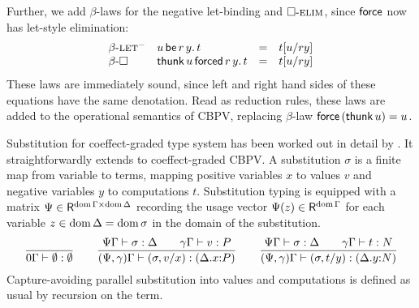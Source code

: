 \documentclass[acmsmall,review,anonymous]{acmart}\settopmatter{printfolios=true,printccs=false,printacmref=false}
\begin{document}
Further, we add $\beta$-laws for the negative
let-binding and $\relim\Box$, since $\tforce$ now has let-style elimination:
\[
\begin{array}{llcl}
\rbeta{\rlet^{-}}
  & \qlet r y u t
  & = & \qsubst u r y t
\\
\rbeta\Box
  & \qforced r {\thunk u} y t
  & = & \qsubst u r y t
\\
\end{array}
\]
These laws are immediately sound, since left and right hand sides of
these equations have the same denotation.
%
Read as reduction rules, these laws are added to the operational
semantics of CBPV, replacing $\beta$-law $\force{(\thunk u)} = u$.

Substitution for coeffect-graded type system has been worked
out in detail by \citet{atkeyWood:types19}.  It straightforwardly extends to
coeffect-graded CBPV.
%
A substitution $\sigma$ is a finite map from variable to terms,
mapping positive variables $x$ to values $v$ and negative variables
$y$ to computations $t$.  Substitution typing
\fbox{$\SubstTy \Psi \Gamma \sigma \Delta$} is equipped with a matrix
$\Psi \in \R^{\dom\Gamma \times \dom\Delta}$ recording the usage
vector $\Psi(z) \in \R^{\dom\Gamma}$ for each variable
$z \in \dom\Delta = \dom \sigma$ in the domain of the substitution.
\[
  \ru{
    }{\SubstTy {0} \Gamma \sempty \cempty}
\qquad
  \ru{\SubstTy \Psi \Gamma \sigma \Delta \qquad
      \qValTy \gamma \Gamma v P
    }{\pSubstTy {\Psi,\gamma} \Gamma {\sext \sigma x v} {\ext \Delta x P}}
\qquad
  \ru{\SubstTy \Psi \Gamma \sigma \Delta \qquad
      \qCompTy \gamma \Gamma t N
    }{\pSubstTy {\Psi,\gamma} \Gamma {\sext \sigma y t} {\ext \Delta y N}}
\]
Capture-avoiding parallel substitution into values  and
computations  is defined as usual by recursion on the term.
\end{document}
